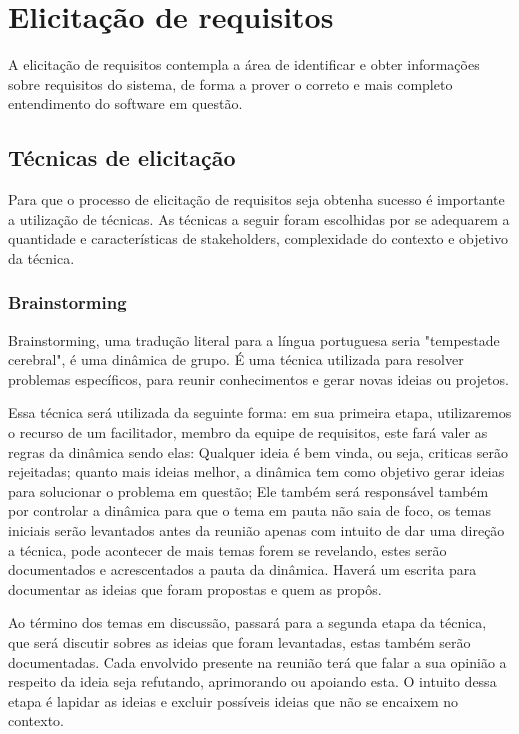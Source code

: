 \chapter[Elicitação de requisitos]{Elicitação de requisitos}
A elicitação de requisitos contempla a área de identificar e obter informações sobre requisitos do sistema, de forma a prover o correto e mais completo entendimento do software em questão.

\section{Técnicas de elicitação}
       
Para que o processo de elicitação de requisitos seja obtenha sucesso é importante a utilização de técnicas. As técnicas a seguir foram escolhidas por se adequarem a quantidade e características de stakeholders, complexidade do contexto e objetivo da técnica. 

\subsection{Brainstorming}
Brainstorming, uma tradução literal para a língua portuguesa seria "tempestade cerebral", é uma dinâmica de grupo. É uma técnica utilizada para resolver problemas específicos, para reunir conhecimentos e gerar novas ideias ou projetos\cite{leffingwell2011}.

Essa técnica será utilizada da seguinte forma: em sua primeira etapa, utilizaremos o recurso de um facilitador, membro da equipe de requisitos, este fará valer as regras da dinâmica sendo elas: Qualquer ideia é bem vinda, ou seja, criticas serão rejeitadas; quanto mais ideias melhor, a dinâmica tem como objetivo gerar ideias para solucionar o problema em questão; Ele também será responsável também por controlar a dinâmica para que o tema em pauta não saia de foco, os temas iniciais serão levantados antes da reunião apenas com intuito de dar uma direção a técnica, pode acontecer de mais temas forem se revelando, estes serão documentados e acrescentados a pauta da dinâmica. Haverá um escrita para documentar as ideias que foram propostas e quem as propôs.

Ao término dos temas em discussão, passará para a segunda etapa da técnica, que será discutir sobres as ideias que foram levantadas, estas também serão documentadas. Cada envolvido presente na reunião terá que falar a sua opinião a respeito da ideia seja refutando,  aprimorando ou apoiando esta. O intuito dessa etapa é lapidar as ideias e excluir possíveis ideias que não se encaixem no contexto. 

